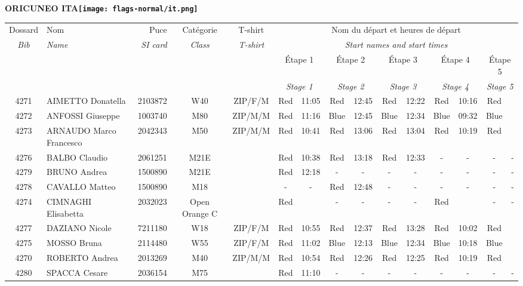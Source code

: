\documentclass{report}
\begin{document}
\newpage
  \Huge \centering \bfseries ORICUNEO  ITA\normalfont \footnotesize \sffamily \hfill \texttt{[image: flags-normal/it.png]} \newline 
  \begin{longtable}{|c|l|r|c|c|*{5}{cc|}}
    Dossard & Nom  & Puce    & Catégorie & T-shirt & \multicolumn{10}{c|}{Nom du départ et heures de départ} \\
    \itshape Bib     & \itshape Name & \itshape SI card & \itshape Class  & \itshape  T-shirt  & \multicolumn{10}{c|}{\itshape Start names and start times} \\
    \hline
    & & & & & \multicolumn{2}{c|}{Étape 1} & \multicolumn{2}{c|}{Étape 2} & \multicolumn{2}{c|}{Étape 3} & \multicolumn{2}{c|}{Étape 4} & \multicolumn{2}{c|}{Étape 5} \\
    & & & & & \multicolumn{2}{c|}{\itshape Stage 1} & \multicolumn{2}{c|}{\itshape Stage 2} & \multicolumn{2}{c|}{\itshape Stage 3} & \multicolumn{2}{c|}{\itshape Stage 4} & \multicolumn{2}{c|}{\itshape Stage 5} \\
    \hline
    4271 & AIMETTO Donatella & 2103872 & W40 & ZIP/F/M & Red & 11:05 & Red & 12:45 & Red & 12:22 & Red & 10:16 & Red &  \\
    4272 & ANFOSSI Giuseppe & 1003740 & M80 & ZIP/M/M & Red & 11:16 & Blue & 12:45 & Blue & 12:34 & Blue & 09:32 & Blue &  \\
    4273 & ARNAUDO Marco Francesco & 2042343 & M50 & ZIP/M/M & Red & 10:41 & Red & 13:06 & Red & 13:04 & Red & 10:19 & Red &  \\
    4276 & BALBO Claudio & 2061251 & M21E &   & Red & 10:38 & Red & 13:18 & Red & 12:33 & - &  - & - &  -\\
    4279 & BRUNO Andrea & 1500890 & M21E &   & Red & 12:18 & - &  - & - &  - & - &  - & - &  -\\
    4278 & CAVALLO Matteo & 1500890 & M18 &   & - &  - & Red & 12:48 & - &  - & - &  - & - &  -\\
    4274 & CIMNAGHI Elisabetta & 2032023 & Open Orange C &   & Red &   & - &  - & - &  - & Red &   & - &  -\\
    4277 & DAZIANO Nicole & 7211180 & W18 & ZIP/F/M & Red & 10:55 & Red & 12:37 & Red & 13:28 & Red & 10:02 & Red &  \\
    4275 & MOSSO Bruna & 2114480 & W55 & ZIP/F/M & Red & 11:02 & Blue & 12:13 & Blue & 12:34 & Blue & 10:18 & Blue &  \\
    4270 & ROBERTO Andrea & 2013269 & M40 & ZIP/M/M & Red & 10:54 & Red & 12:26 & Red & 12:25 & Red & 10:19 & Red &  \\
    4280 & SPACCA Cesare & 2036154 & M75 &   & Red & 11:10 & - &  - & - &  - & - &  - & - &  -\\
  \end{longtable}
\end{document}
